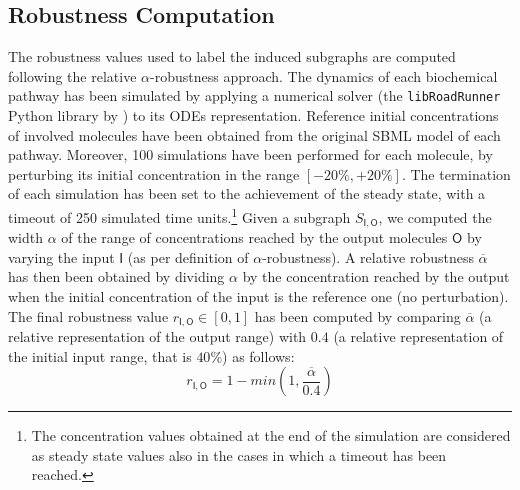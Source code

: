 \subsection{Robustness Computation}\label{sec:robustness-computation}
The robustness values used to label the induced subgraphs are computed following the relative $\alpha$-robustness approach. The dynamics of each biochemical pathway has been simulated by applying a numerical solver (the \texttt{libRoadRunner} Python library by \cite{somogyi2015libroadrunner}) to its ODEs representation. Reference initial concentrations of involved molecules have been obtained from the original SBML model of each pathway. Moreover, 100 simulations have been performed for each molecule, by perturbing its initial concentration in the range $[-20\%,+20\%]$. The termination of each simulation has been set to the achievement of the steady state, with a timeout of 250 simulated time units.\footnote{The concentration values obtained at the end of the simulation are considered as steady state values also in the cases in which a timeout has been reached.} Given a subgraph $S_{\mathsf{I}, \mathsf{O}}$, we computed the width $\alpha$ of the range of concentrations reached by the output molecules $\mathsf{O}$ by varying the input $\mathsf{I}$ (as per definition of $\alpha$-robustness). A relative robustness $\overline{\alpha}$ has then been obtained by dividing $\alpha$ by the concentration reached by the output when the initial concentration of the input is the reference one (no perturbation). The final robustness value $r_{\mathsf{I}, \mathsf{O}} \in [0,1]$ has been computed by comparing $\overline{\alpha}$ (a relative representation of the output range) with $0.4$ (a relative representation of the initial input range, that is $40\%$) as follows:
\[
    r_{\mathsf{I}, \mathsf{O}} = 1 - min (1,\frac{\overline{\alpha}}{0.4})
\]

